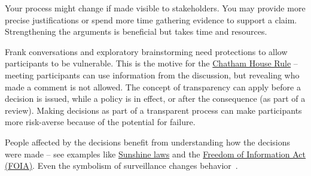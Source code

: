 Your %
process might change if made visible to stakeholders. You may provide more precise justifications or spend more time gathering evidence to support a claim. Strengthening the arguments is beneficial but takes time and resources. 

Frank conversations and exploratory brainstorming need protections to allow participants to be vulnerable. 
This is the motive for the \href{https://en.wikipedia.org/wiki/Chatham_House_Rule}{Chatham House Rule} -- meeting participants can use information from the discussion, but revealing who made a comment is not allowed.
\iftoggle{WPinmargin}{\marginpar{$>$Wikipedia: Chatham House Rule}}{}
The concept of transparency can apply before a decision is issued, while a policy is in effect, or after the consequence (as part of a review). 
Making decisions as part of a transparent process can make participants more risk-averse because of the potential for failure.

People affected by the decisions benefit from understanding how the decisions were made -- see examples like 
\href{https://en.wikipedia.org/wiki/Government_in_the_Sunshine_Act}{Sunshine laws} and the 
\href{https://en.wikipedia.org/wiki/Freedom_of_Information_Act_(United_States)}{Freedom of Information Act (FOIA)}. 
\iftoggle{WPinmargin}{\marginpar{$>$Wikipedia: Freedom of Information Act}}{}
Even the symbolism of surveillance changes behavior~\cite{2005_Haley, 2007_Burnham}.




